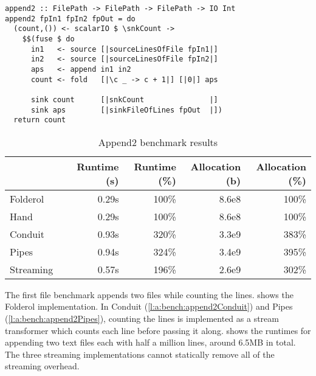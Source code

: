 \begin{lstlisting}[float,label=l:bench:append2Folderol,caption=Folderol implementation of \Hs/append2/]
append2 :: FilePath -> FilePath -> FilePath -> IO Int
append2 fpIn1 fpIn2 fpOut = do
  (count,()) <- scalarIO $ \snkCount ->
    $$(fuse $ do
      in1   <- source [|sourceLinesOfFile fpIn1|]
      in2   <- source [|sourceLinesOfFile fpIn2|]
      aps   <- append in1 in2
      count <- fold   [|\c _ -> c + 1|] [|0|] aps

      sink count      [|snkCount               |]
      sink aps        [|sinkFileOfLines fpOut  |])
  return count
\end{lstlisting}

\begin{table}
\begin{center}
\begin{tabular}{ll|rrrr}
& & Runtime (s)  & Runtime (\%) & Allocation (b) & Allocation (\%) \\
\hline
Folderol &          & 0.29s &   100\% & 8.6e8 & 100\% \\
Hand     &          & 0.29s &   100\% & 8.6e8 & 100\% \\
Conduit &           & 0.93s &   320\% & 3.3e9 & 383\% \\
Pipes  &            & 0.94s &   324\% & 3.4e9 & 395\% \\
Streaming &         & 0.57s &   196\% & 2.6e9 & 302\% \\
\end{tabular}
\end{center}
\caption[Append2 benchmark results]{Append2 benchmark results}
\label{table:bench:append2}
\end{table}


The first file benchmark appends two files while counting the lines.
 shows the Folderol implementation.
In Conduit (\cref{l:a:bench:append2Conduit}) and Pipes (\cref{l:a:bench:append2Pipes}), counting the lines is implemented as a stream transformer which counts each line before passing it along.
 shows the runtimes for appending two text files each with half a million lines, around 6.5MB in total.
The three streaming implementations cannot statically remove all of the streaming overhead.


